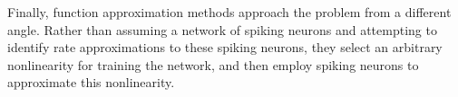 \noindent Finally, function approximation methods approach the problem from a different angle. Rather than assuming a network of spiking neurons and attempting to identify rate approximations to these spiking neurons, they select an arbitrary nonlinearity for training the network, and then employ spiking neurons to approximate this nonlinearity.







